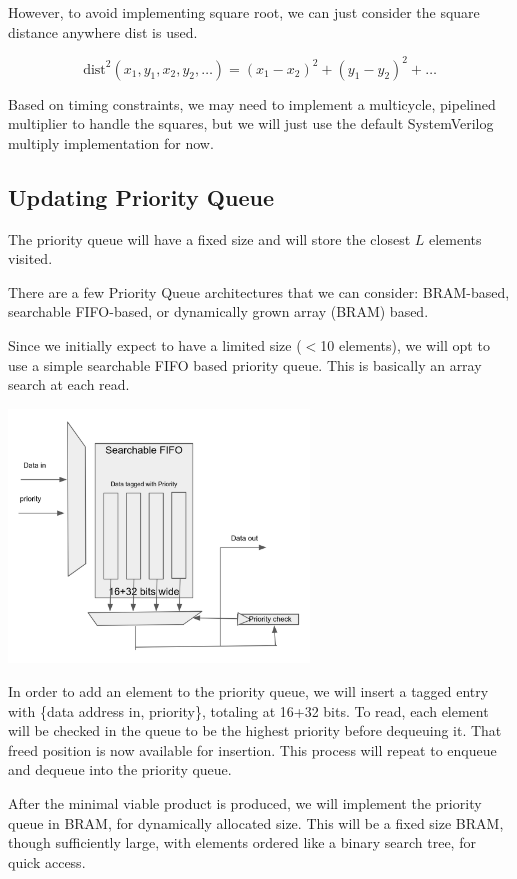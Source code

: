 \documentclass{article}
\begin{document}
However, to avoid implementing square root, we can just consider the square distance anywhere dist is used.

$$\text{dist}^2(x_1,y_1,x_2,y_2,\dots)=(x_1-x_2)^2+(y_1-y_2)^2+\dots$$

Based on timing constraints, we may need to implement a multicycle, pipelined multiplier to handle the squares, but we will just use the default SystemVerilog multiply implementation for now.

\subsection{Updating Priority Queue}
The priority queue will have a fixed size and will store the closest $L$ elements visited. 

There are a few Priority Queue architectures that we can consider: BRAM-based, searchable FIFO-based, or dynamically grown array (BRAM) based.  


Since we initially expect to have a limited size ($<$10 elements), we will opt to use a simple searchable FIFO based priority queue. This is basically an array search at each read.

\includegraphics[width=8cm]{pq2.png}

In order to add an element to the priority queue, we will insert a tagged entry with \{data address in, priority\}, totaling at 16+32 bits. To read, each element will be checked in the queue to be the highest priority before dequeuing it. That freed position is now available for insertion. This process will repeat to enqueue and dequeue into the priority queue.


After the minimal viable product is produced, we will implement the priority queue in BRAM, for dynamically allocated size. This will be a fixed size BRAM, though sufficiently large, with elements ordered like a binary search tree, for quick access.
\end{document}
